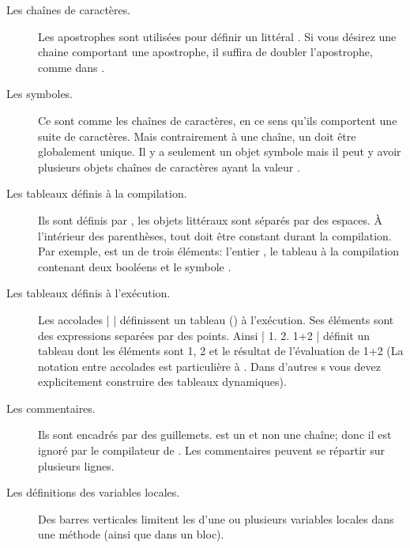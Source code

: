 \documentclass[a4paper,10pt,twoside]{book}
\begin{document}
\begin{description}
\item[Les chaînes de caract\`{e}res.] Les apostrophes sont utilis\'{e}es pour d\'{e}finir un  litt\'{e}ral .
Si vous d\'{e}sirez une chaine comportant une apostrophe, il suffira de doubler l'apostrophe, comme dans .

\item[Les symboles.] Ce sont comme les chaînes de caract\`{e}res, en ce sens qu'ils comportent une suite de caract\`{e}res.  
Mais contrairement \`{a} une chaîne, un  doit \^{e}tre globalement unique.
Il y a seulement un objet symbole  mais il peut y avoir plusieurs objets chaînes de caract\`{e}res ayant la valeur .

\item[Les tableaux définis \`{a} la compilation.] Ils sont d\'{e}finis par \ct{#( )}, les objets litt\'{e}raux sont s\'{e}par\'{e}s par des espaces.
À l'int\'{e}rieur des parenth\`{e}ses, tout doit \^{e}tre constant durant la compilation.
Par exemple,   est un
  de trois \'{e}l\'{e}ments: l'entier , le tableau \`{a} la compilation contenant deux bool\'{e}ens et le symbole .

\item[Les tableaux définis \`{a} l'ex\'{e}cution.] Les accolades \ct|{ }|
  d\'{e}finissent un tableau () \`{a} l'ex\'{e}cution.
Ses \'{e}l\'{e}ments sont des expressions separ\'{e}es par des points.
Ainsi \ct|{ 1. 2. 1+2 }| d\'{e}finit un tableau dont les \'{e}l\'{e}ments sont 1, 2 et le r\'{e}sultat de l'\'{e}valuation de 1+2
(La notation entre accolades est particuli\`{e}re \`{a} \sq.
Dans d'autres \st{}s vous devez explicitement construire des tableaux dynamiques).

\item[Les commentaires.] Ils sont encadr\'{e}s par des guillemets.
 est un  et non une
chaîne; donc il est ignor\'{e} par le compilateur de \sq.
Les commentaires peuvent se r\'{e}partir sur plusieurs lignes.
		
\item[Les d\'{e}finitions des variables locales.] Des barres
  verticales \ct{| |} limitent les
   d'une ou plusieurs variables
  locales dans une m\'{e}thode (ainsi que dans un bloc).


\end{description}
\end{document}
